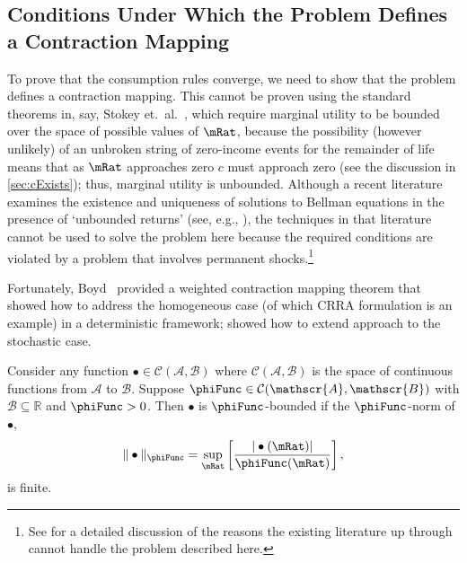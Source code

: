 \documentclass[BufferStockTheory]{subfiles}
\begin{document}
\hypertarget{Conditions-Under-Which-the-Problem-Defines-a-Contraction-Mapping}{}
\subsection{Conditions Under Which the Problem Defines a Contraction Mapping}

\label{subsec:contraction}

To prove that the consumption rules converge, we need to show that the
problem defines a contraction mapping. This cannot be proven using the
standard theorems in, say, Stokey et.\ al.~\citeyearpar{slpMethods},
which require marginal utility to be bounded over the space of
possible values of $\mRat$, because the possibility (however unlikely)
of an unbroken string of zero-income events for the remainder of life
means that as $\mRat$ approaches zero $c$ must approach zero (see the
discussion in \ref{sec:cExists}); thus, marginal utility is unbounded.
Although a recent literature examines the existence and uniqueness 
of solutions to Bellman equations in the presence of `unbounded returns' (see, e.g.,
\cite{mnUnique}), the techniques in that literature
cannot be used to solve the problem here because the required conditions 
are violated by a problem that involves permanent shocks.\footnote{See \cite{yaoNote}
  for a detailed discussion of the reasons the existing literature up through \cite{mnUnique} cannot handle 
  the problem described here.}

Fortunately, Boyd~\citeyearpar{jboydWeighted} provided a weighted contraction mapping theorem that \cite{asHomogeneous} showed how to address the homogeneous case (of which CRRA formulation is an example) in a deterministic framework; \cite{duranDiscounting} showed how to extend \cite{jboydWeighted} approach to the stochastic case.
\begin{defn}
  Consider any function $\bullet\in \mathcal{C}(\mathscr{A},\mathscr{B})$ where $\mathcal{C}(\mathscr{A},\mathscr{B})$ is the space of continuous functions from $\mathscr{A}$ to $%
  \mathscr{B}$. Suppose $\phiFunc \in \mathcal{C}(\mathscr{A},\mathscr{B})$ with $%
  \mathscr{B}\subseteq\mathbb{R}$ and $\phiFunc >0$. Then $\bullet$ is $\phiFunc$-bounded if the $\phiFunc$-norm of $\bullet$,
  \begin{equation}
    \Vert \bullet\Vert _{\phiFunc }=\sup_{\mRat}\left[ \frac{|\bullet(\mRat)|}{\phiFunc (\mRat)}\right] ,
    \label{eq:phinorm}
  \end{equation}%
  is finite.
\end{defn}
\end{document}
